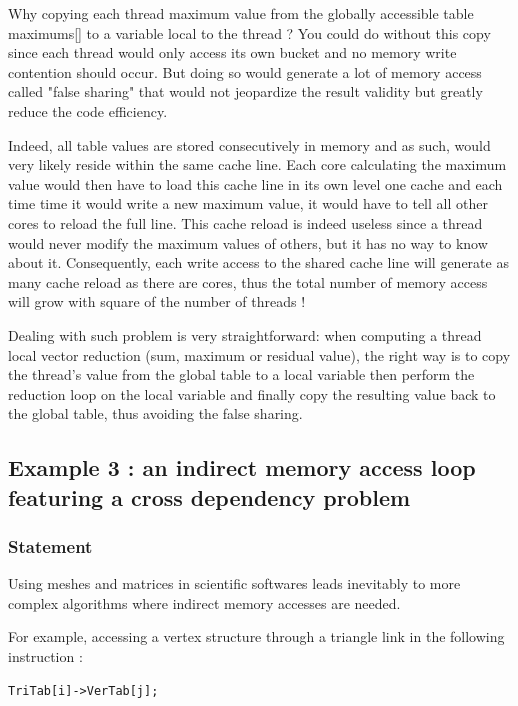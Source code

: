 \documentclass[a4paper,12pt]{article}
\begin{document}
Why copying each thread maximum value from the globally accessible table maximums[] to a variable local to the thread ? You could do without this copy since each thread would only access its own bucket and no memory write contention should occur.
But doing so would generate a lot of memory access called "false sharing" that would not jeopardize the result validity but greatly reduce the code efficiency.

Indeed, all table values are stored consecutively in memory and as such, would very likely reside within the same cache line. Each core calculating the maximum value would then have to load this cache line in its own level one cache and each time time it would write a new maximum value, it would have to tell all other cores to reload the full line. This cache reload is indeed useless since a thread would never modify the maximum values of others, but it has no way to know about it. Consequently, each write access to the shared cache line will generate as many cache reload as there are cores, thus the total number of memory access will grow with square of the number of threads !

Dealing with such problem is very straightforward: when computing a thread local vector reduction (sum, maximum or residual value), the right way is to copy the thread's value from the global table to a local variable then perform the reduction loop on the local variable and finally copy the resulting value back to the global table, thus avoiding the false sharing.

\subsection{Example 3 : an indirect memory access loop featuring a cross dependency problem}

\subsubsection{Statement}

Using meshes and matrices in scientific softwares leads inevitably to more complex algorithms where indirect memory accesses are needed.

For example, accessing a vertex structure through a triangle link in the following instruction :

\begin{tt}
\begin{verbatim}
TriTab[i]->VerTab[j];
\end{verbatim}
\end{tt}
\normalfont
\end{document}
